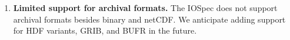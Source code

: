 

\begin{enumerate}

\item {\bf Limited support for archival formats.}  The IOSpec does 
not support archival formats besides binary and netCDF.  We 
anticipate adding support for HDF variants, GRIB, and BUFR in 
the future.

\end{enumerate}



